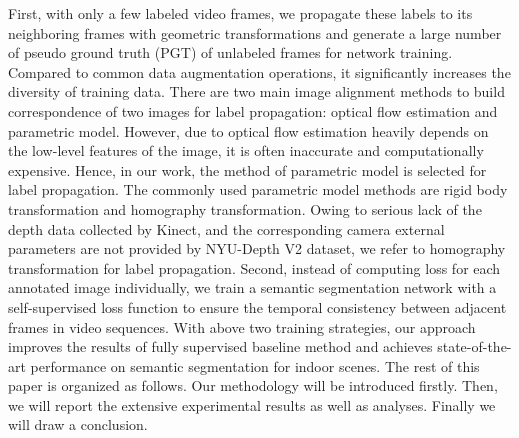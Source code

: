 First, with only a few labeled video frames, we propagate these labels to its neighboring frames with geometric transformations and generate a large number of pseudo ground truth (PGT) of unlabeled frames for network training. 
%
Compared to common data augmentation operations, it significantly increases the diversity of training data.
%
There are two main image alignment methods to build correspondence of two images for label propagation: optical flow estimation and parametric model.
%
However, due to optical flow estimation heavily depends on the low-level features of the image, it is often inaccurate and computationally expensive.
%
Hence, in our work, the method of parametric model is selected for label propagation.
%
The commonly used parametric model methods are rigid body transformation and homography transformation.
%
Owing to serious lack of the depth data collected by Kinect, and the corresponding camera external parameters are not provided by NYU-Depth V2 dataset,
%
we refer to homography transformation for label propagation.
%
Second, instead of computing loss for each annotated image individually, we train a semantic segmentation network with a self-supervised loss function to ensure the temporal consistency between adjacent frames in video sequences.
%
With above two training strategies, our approach improves the results of fully supervised baseline method and achieves state-of-the-art performance on semantic segmentation for indoor scenes. 
%
The rest of this paper is organized as follows.
% 
Our methodology will be introduced firstly.
%
Then, we will report the extensive experimental results as well as analyses. 
%
Finally we will draw a conclusion.

